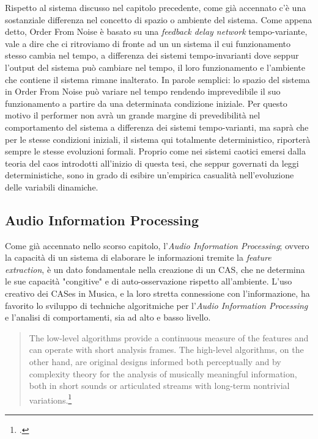 Rispetto al sistema discusso nel capitolo precedente, 
come già accennato c'è una sostanziale differenza nel concetto di spazio
o ambiente del sistema. 
Come appena detto, Order From Noise è basato su una \textit{feedback delay network} 
tempo-variante, vale a dire che ci ritroviamo di fronte ad un un sistema il cui
funzionamento stesso cambia nel tempo, a differenza dei sistemi tempo-invarianti
dove seppur l'output del sistema può cambiare nel tempo, 
il loro funzionamento e l'ambiente che contiene il sistema rimane inalterato.
In parole semplici: lo spazio del sistema in Order From Noise può variare nel tempo
rendendo imprevedibile il suo funzionamento a partire da una determinata condizione 
iniziale.
Per questo motivo il performer non avrà un grande margine di prevedibilità 
nel comportamento del sistema a differenza dei sistemi tempo-varianti,
ma saprà che per le stesse condizioni iniziali, il sistema qui totalmente
deterministico, riporterà sempre le stesse evoluzioni formali.
Proprio come nei sistemi caotici emersi dalla teoria del caos introdotti all'inizio di questa tesi,
che seppur governati da leggi deterministiche, 
sono in grado di esibire un'empirica casualità nell'evoluzione delle variabili dinamiche. 

\subsection{Audio Information Processing}
\label{sec:Audio Information Processing}
Come già accennato nello scorso capitolo, l'\textit{Audio Information Processing};
ovvero la capacità di un sistema di elaborare le informazioni
tremite la \textit{feature extraction}, è un dato fondamentale nella creazione 
di un CAS, che ne determina le sue capacità "congitive" e di auto-osservazione
rispetto all'ambiente. 
L'uso creativo dei CASes in Musica,
e la loro stretta connessione con l'informazione,
ha favorito lo sviluppo di techniche algoritmiche per l'\textit{Audio Information Processing} 
e l'analisi di comportamenti, sia ad alto e basso livello.

\begin{quote}
    The low-level algorithms provide a continuous measure of the features and can operate
    with short analysis frames. The high-level algorithms, on the other hand, are original designs informed both perceptually
    and by complexity theory for the analysis of musically meaningful information, both in short sounds or articulated
    streams with long-term nontrivial variations.\footcite{sanfilippo_time-domain_2021}
\end{quote}


